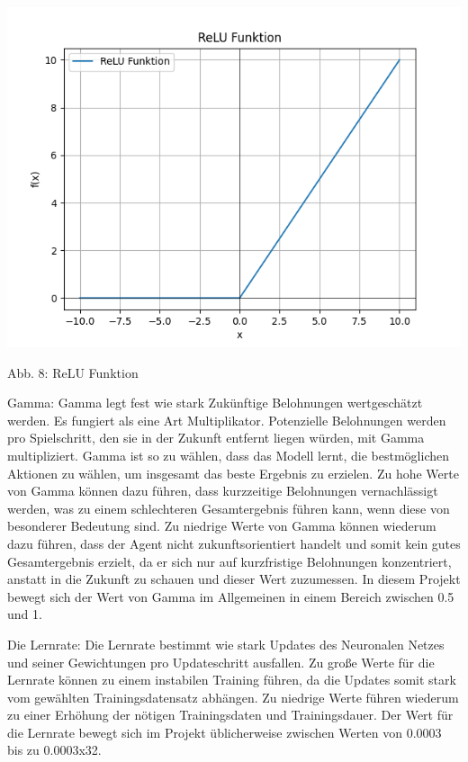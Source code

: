 \begin{minipage}{\linewidth}
	\vspace{0.5cm}
	\includegraphics[width=1\textwidth]{Bilder/ReLU.png}
	
	Abb. 8: ReLU Funktion \\
\end{minipage}

Gamma: Gamma legt fest wie stark Zukünftige Belohnungen wertgeschätzt werden. Es fungiert als eine Art Multiplikator. Potenzielle Belohnungen werden pro Spielschritt, den sie in der Zukunft entfernt liegen würden, mit Gamma multipliziert. Gamma ist so zu wählen, dass das Modell lernt, die bestmöglichen Aktionen zu wählen, um insgesamt das beste Ergebnis zu erzielen. Zu hohe Werte von Gamma können dazu führen, dass kurzzeitige Belohnungen vernachlässigt werden, was zu einem schlechteren Gesamtergebnis führen kann, wenn diese von besonderer Bedeutung sind. Zu niedrige Werte von Gamma können wiederum dazu führen, dass der Agent nicht zukunftsorientiert handelt und somit kein gutes Gesamtergebnis erzielt, da er sich nur auf kurzfristige Belohnungen konzentriert, anstatt in die Zukunft zu schauen und dieser Wert zuzumessen. In diesem Projekt bewegt sich der Wert von Gamma im Allgemeinen in einem Bereich zwischen 0.5 und 1.

Die Lernrate: Die Lernrate bestimmt wie stark Updates des Neuronalen Netzes und seiner Gewichtungen pro Updateschritt ausfallen. Zu große Werte für die Lernrate können zu einem instabilen Training führen, da die Updates somit stark vom gewählten Trainingsdatensatz abhängen. Zu niedrige Werte führen wiederum zu einer Erhöhung der nötigen Trainingsdaten und Trainingsdauer. Der Wert für die Lernrate bewegt sich im Projekt üblicherweise zwischen Werten von 0.0003 bis zu 0.0003x32.

